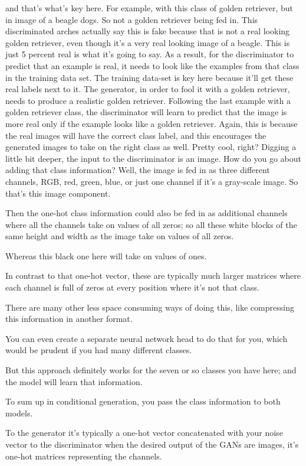 \documentclass[11pt, onecolumn]{article}
\begin{document}
and that's what's key here.
For example, with this class of golden retriever,
but in image of a beagle dogs.
So not a golden retriever being fed in.
This discriminated arches actually say this is
fake because that is not a real looking golden retriever,
even though it's a very real looking image of a beagle.
This is just 5 percent real is what it's going to say.
As a result, for the discriminator to
predict that an example is real,
it needs to look like the examples
from that class in the training data set.
The training data-set is key here because it'll
get these real labels next to it.
The generator, in order to
fool it with a golden retriever,
needs to produce a realistic golden retriever.
Following the last example with a golden retriever class,
the discriminator will learn to predict that the image is
more real only if
the example looks like a golden retriever.
Again, this is because
the real images will have the correct class label,
and this encourages the generated images to take on
the right class as well. Pretty cool, right?
Digging a little bit deeper,
the input to the discriminator is an image.
How do you go about adding that class information?
Well, the image is fed in as three different channels,
RGB, red, green, blue,
or just one channel if it's a gray-scale image.
So that's this image component.

Then the one-hot class information could also be fed in as additional channels where all the channels take on values of all zeros; so all these white blocks of the same height and width as the image take on values of all zeros.

Whereas this black one here will take on values of ones.

In contrast to that one-hot vector, these are typically much larger matrices where each channel is full of zeros at every position where it's not that class.

There are many other less space consuming ways of doing this, like compressing this information in another format.

You can even create a separate neural network head to do that for you, which would be prudent if you had many different classes.

But this approach definitely works for the seven or so classes you have here; and the model will learn that information.

To sum up in conditional generation, you pass the class information to both models.

To the generator it's typically a one-hot vector concatenated with your noise vector to the discriminator when the desired output of the GANs are images, it's one-hot matrices representing the channels.
\end{document}
